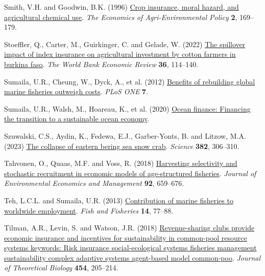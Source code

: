 \documentclass[
  letterpaper,
  DIV=11,
  numbers=noendperiod]{scrartcl}
\newlength{\cslhangindent}
\newlength{\cslentryspacingunit} %
\newenvironment{CSLReferences}[2] %
 {%
  \setlength{\parindent}{0pt}
  \ifodd #1
  \let\oldpar\par
  \def\par{\hangindent=\cslhangindent\oldpar}
  \fi
  \setlength{\parskip}{#2\cslentryspacingunit}
 }%
 {}
\theoremstyle{plain}
\theoremstyle{plain}
\theoremstyle{remark}
\begin{document}
\begin{CSLReferences}{1}{0}
\leavevmode{}%
Smith, V.H. and Goodwin, B.K. (1996)
\href{https://doi.org/10.2307/1243714}{Crop insurance, moral hazard, and
agricultural chemical use}. \emph{The Economics of Agri-Environmental
Policy} \textbf{2}, 169--179.

\leavevmode{}%
Stoeffler, Q., Carter, M., Guirkinger, C. and Gelade, W. (2022)
\href{https://doi.org/10.1093/wber}{The spillover impact of index
insurance on agricultural investment by cotton farmers in burkina faso}.
\emph{The World Bank Economic Review} \textbf{36}, 114--140.

\leavevmode{}%
Sumaila, U.R., Cheung, W., Dyck, A., et al. (2012)
\href{https://doi.org/10.1371/journal.pone.0040542}{Benefits of
rebuilding global marine fisheries outweigh costs}. \emph{PLoS ONE}
\textbf{7}.

\leavevmode{}%
Sumaila, U.R., Walsh, M., Hoareau, K., et al. (2020)
\href{https://www.oceanpanel.org/blue-}{Ocean finance: Financing the
transition to a sustainable ocean economy}.

\leavevmode{}%
Szuwalski, C.S., Aydin, K., Fedewa, E.J., Garber-Yonts, B. and Litzow,
M.A. (2023) \href{https://doi.org/10.1126/SCIENCE.ADF6035}{The collapse
of eastern bering sea snow crab}. \emph{Science} \textbf{382}, 306--310.

\leavevmode{}%
Tahvonen, O., Quaas, M.F. and Voss, R. (2018)
\href{https://doi.org/10.1016/j.jeem.2017.08.011}{Harvesting selectivity
and stochastic recruitment in economic models of age-structured
fisheries}. \emph{Journal of Environmental Economics and Management}
\textbf{92}, 659--676.

\leavevmode{}%
Teh, L.C.L. and Sumaila, U.R. (2013)
\href{https://doi.org/10.1111/j.1467-2979.2011.00450.x}{Contribution of
marine fisheries to worldwide employment}. \emph{Fish and Fisheries}
\textbf{14}, 77--88.

\leavevmode{}%
Tilman, A.R., Levin, S. and Watson, J.R. (2018)
\href{https://doi.org/10.1016/j.jtbi.2018.06.003}{Revenue-sharing clubs
provide economic insurance and incentives for sustainability in
common-pool resource systems keywords: Risk insurance social-ecological
systems fisheries management sustainability complex adaptive systems
agent-based model common-poo}. \emph{Journal of Theoretical Biology}
\textbf{454}, 205--214.


\end{CSLReferences}
\end{document}
